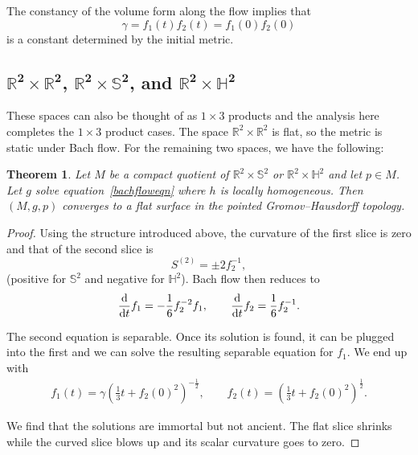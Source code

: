 \documentclass[10pt,a4paper]{amsart}
\numberwithin{equation}{section}
\newtheorem{Theorem}{Theorem}[section]
\newcommand{\dtime}{\frac{{\rm d}}{{\rm d} t}} %
\begin{document}
The constancy of the volume form along the flow implies that
\[
\gamma = f_1(t) f_2(t) = f_1(0) f_2(0)
\]
is a constant determined by the initial metric.

\subsection[$\mathbb{R}^2 \times \mathbb{R}^2$, $\mathbb{R}^2 \times \mathbb{S}^2$, and $\mathbb{R}^2 \times \mathbb{H}^2$]{$\boldsymbol{\mathbb{R}^2 \times \mathbb{R}^2}$, $\boldsymbol{\mathbb{R}^2 \times \mathbb{S}^2}$, and $\boldsymbol{\mathbb{R}^2 \times \mathbb{H}^2}$}

These spaces can also be thought of as $1 \times 3$ products and the analysis here completes the $1 \times 3$ product cases. The space $\mathbb{R}^2 \times \mathbb{R}^2$ is flat, so the metric is static under Bach flow. For the remaining two spaces, we have the following:

\begin{Theorem}Let $M$ be a compact quotient of $\mathbb{R}^2 \times \mathbb{S}^2$ or $\mathbb{R}^2 \times \mathbb{H}^2$ and let $p \in M$. Let $g$ solve equation~\eqref{bachfloweqn} where $h$ is locally homogeneous. Then $(M, g, p)$ converges to a flat surface in the pointed Gromov--Hausdorff topology.
\end{Theorem}

\begin{proof}Using the structure introduced above, the curvature of the first slice is zero and that of the second slice is
\[
S^{(2)} = \pm 2 f_2^{-1},
\]
(positive for $\mathbb{S}^2$ and negative for $\mathbb{H}^2$). Bach flow then reduces to
\begin{equation*}
\dtime f_1 = -\frac{1}{6} f_2^{-2} f_1,\qquad
\dtime f_2 = \frac{1}{6} f_2^{-1}.
\end{equation*}

The second equation is separable. Once its solution is found, it can be plugged into the first and we can solve the resulting separable equation for $f_1$. We end up with
\begin{gather*}
f_1(t) = \gamma \left(\frac{1}{3} t + f_2(0)^2 \right)^{-\frac{1}{2}},\qquad
f_2(t) = \left(\frac{1}{3} t + f_2(0)^2 \right)^{\frac{1}{2}}.
\end{gather*}

We find that the solutions are immortal but not ancient. The flat slice shrinks while the curved slice blows up and its scalar curvature goes to zero.
\end{proof}
\end{document}
